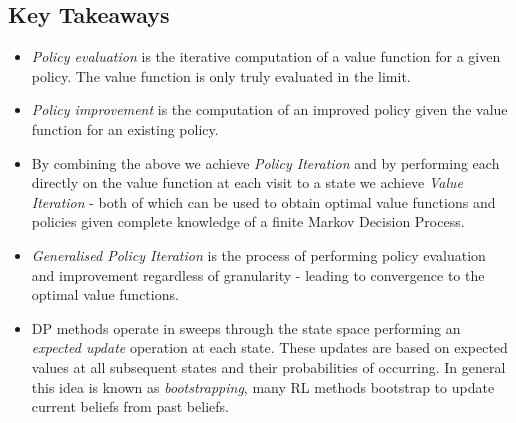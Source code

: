 \subsection{Key Takeaways}
\begin{itemize}
	\item \textit{Policy evaluation} is the iterative computation of a value function for a given policy. The value function is only truly evaluated in the limit.
	\item \textit{Policy improvement} is the computation of an improved policy given the value function for an existing policy.
	\item By combining the above we achieve \textit{Policy Iteration} and by performing each directly on the value function at each visit to a state we achieve \textit{Value Iteration} - both of which can be used to obtain optimal value functions and policies given complete knowledge of a finite Markov Decision Process.
	\item \textit{Generalised Policy Iteration} is the process of performing policy evaluation and improvement regardless of granularity - leading to convergence to the optimal value functions.
	\item DP methods operate in sweeps through the state space performing an \textit{expected update} operation at each state. These updates are based on expected values at all subsequent states and their probabilities of occurring. In general this idea is known as \textit{bootstrapping}, many RL methods bootstrap to update current beliefs from past beliefs.
\end{itemize}
